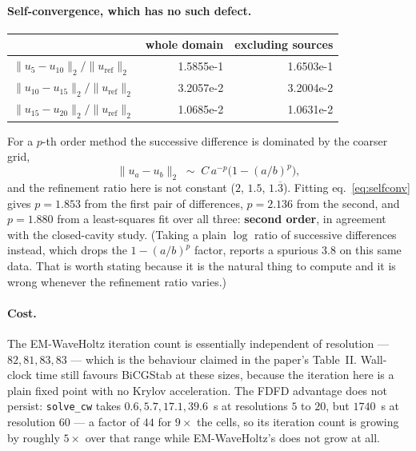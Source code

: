 \documentclass[11pt]{article}
\begin{document}
\paragraph{Self-convergence, which has no such defect.}
\begin{center}
\small
\begin{tabular}{lrr}
\toprule
& whole domain & excluding sources\\
\midrule
$\|u_5 - u_{10}\|_2 / \|u_{\text{ref}}\|_2$    & 1.5855e-1 & 1.6503e-1\\
$\|u_{10} - u_{15}\|_2 / \|u_{\text{ref}}\|_2$ & 3.2057e-2 & 3.2004e-2\\
$\|u_{15} - u_{20}\|_2 / \|u_{\text{ref}}\|_2$ & 1.0685e-2 & 1.0631e-2\\
\bottomrule
\end{tabular}
\end{center}

\noindent For a $p$-th order method the successive difference is dominated by
the coarser grid,
\begin{equation}
  \|u_a - u_b\|_2 \;\sim\; C\,a^{-p}\big(1 - (a/b)^p\big),
  \label{eq:selfconv}
\end{equation}
and the refinement ratio here is not constant ($2$, $1.5$, $1.\overline{3}$).
Fitting eq.~\eqref{eq:selfconv} gives $p = 1.853$ from the first pair of
differences, $p = 2.136$ from the second, and $p = 1.880$ from a least-squares
fit over all three: \textbf{second order}, in agreement with the closed-cavity
study. (Taking a plain $\log$ ratio of successive differences instead, which
drops the $1-(a/b)^p$ factor, reports a spurious $3.8$ on this same data. That
is worth stating because it is the natural thing to compute and it is wrong
whenever the refinement ratio varies.)

\paragraph{Cost.}
The EM-WaveHoltz iteration count is essentially independent of resolution ---
$82, 81, 83, 83$ --- which is the behaviour claimed in the paper's Table~II.
Wall-clock time still favours BiCGStab at these sizes, because the iteration
here is a plain fixed point with no Krylov acceleration. The FDFD advantage
does not persist: \texttt{solve\_cw} takes $0.6, 5.7, 17.1, 39.6$~s at
resolutions $5$ to $20$, but $1740$~s at resolution $60$ --- a factor of $44$
for $9\times$ the cells, so its iteration count is growing by roughly $5\times$
over that range while EM-WaveHoltz's does not grow at all.
\end{document}
